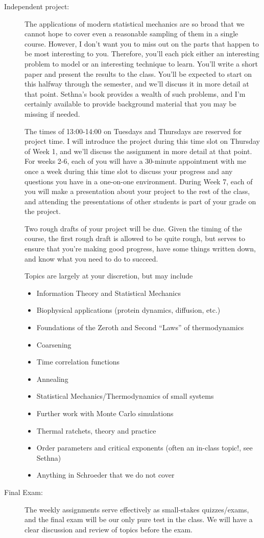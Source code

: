 \documentclass[12pt]{article}
\begin{document}
\begin{description}
    \item[Independent project:]The applications of modern
statistical mechanics are so broad that we cannot hope to cover even a
reasonable sampling of them in a single course. However, I don't want
you to miss out on the parts that happen to be most interesting to
you. Therefore, you'll each pick either an interesting problem to
model or an interesting technique to learn. You'll write a short paper
and present the results to the class. You'll be expected to start on
this halfway through the semester, and we'll discuss it in more detail
at that point. Sethna's book provides a wealth of such problems, and
I'm certainly available to provide background material that you may be
missing if needed.

The times of 13:00-14:00 on Tuesdays and Thursdays are reserved for project time. I will introduce the project during this time slot on Thursday of Week 1, and we'll discuss the assignment in more detail at that point. For weeks 2-6, each of you will have a 30-minute appointment with me once a week during this time slot to discuss your progress and any questions you have in a one-on-one environment. During Week 7, each of you will make a presentation about your project to the rest of the class, and attending the presentations of other students is part of your grade on the project.

Two rough drafts of your project will be due. Given the timing of the course, the first rough draft is allowed to be quite rough, but serves to ensure that you're making good progress, have some things written down, and know what you need to do to succeed.

Topics are largely at your discretion, but may include
\vspace{-0.05in}
{\small
\begin{itemize}
\item Information Theory and Statistical Mechanics
  \item Biophysical applications (protein dynamics, diffusion, etc.)
  \item Foundations of the Zeroth and Second ``Laws'' of thermodynamics
  \item Coarsening
  \item Time correlation functions
  \item Annealing
  \item Statistical Mechanics/Thermodynamics of small systems
  \item Further work with Monte Carlo simulations
  \item Thermal ratchets, theory and practice
  \item Order parameters and critical exponents (often an in-class topic!, see Sethna)
  \item Anything in Schroeder that we do not cover
  \end{itemize}
}
    \item[Final Exam:] The weekly assignments serve effectively as small-stakes quizzes/exams, and the final exam will be our only pure test in the class. We will have a clear discussion and review of topics before the exam.


\end{description}
\end{document}
